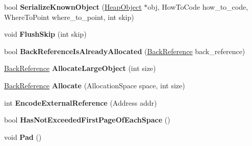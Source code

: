 \begin{DoxyCompactItemize}
\item 
bool {\bfseries Serialize\+Known\+Object} (\hyperlink{classv8_1_1internal_1_1_heap_object}{Heap\+Object} $\ast$obj, How\+To\+Code how\+\_\+to\+\_\+code, Where\+To\+Point where\+\_\+to\+\_\+point, int skip)\hypertarget{classv8_1_1internal_1_1_serializer_a27e6e9673737b561ecb102c2b6236034}{}\label{classv8_1_1internal_1_1_serializer_a27e6e9673737b561ecb102c2b6236034}

\item 
void {\bfseries Flush\+Skip} (int skip)\hypertarget{classv8_1_1internal_1_1_serializer_a7e2eb2286a158742af313150f62b1b7a}{}\label{classv8_1_1internal_1_1_serializer_a7e2eb2286a158742af313150f62b1b7a}

\item 
bool {\bfseries Back\+Reference\+Is\+Already\+Allocated} (\hyperlink{classv8_1_1internal_1_1_back_reference}{Back\+Reference} back\+\_\+reference)\hypertarget{classv8_1_1internal_1_1_serializer_a208e83e360350f15aa04edf591bcba35}{}\label{classv8_1_1internal_1_1_serializer_a208e83e360350f15aa04edf591bcba35}

\item 
\hyperlink{classv8_1_1internal_1_1_back_reference}{Back\+Reference} {\bfseries Allocate\+Large\+Object} (int size)\hypertarget{classv8_1_1internal_1_1_serializer_ac0df9e2797e2022aca9eee374cfbe23e}{}\label{classv8_1_1internal_1_1_serializer_ac0df9e2797e2022aca9eee374cfbe23e}

\item 
\hyperlink{classv8_1_1internal_1_1_back_reference}{Back\+Reference} {\bfseries Allocate} (Allocation\+Space space, int size)\hypertarget{classv8_1_1internal_1_1_serializer_a130c394bdab285e1c1f1c06ac33eee64}{}\label{classv8_1_1internal_1_1_serializer_a130c394bdab285e1c1f1c06ac33eee64}

\item 
int {\bfseries Encode\+External\+Reference} (Address addr)\hypertarget{classv8_1_1internal_1_1_serializer_ab710617f1fb4f096d8356d0ae83315c3}{}\label{classv8_1_1internal_1_1_serializer_ab710617f1fb4f096d8356d0ae83315c3}

\item 
bool {\bfseries Has\+Not\+Exceeded\+First\+Page\+Of\+Each\+Space} ()\hypertarget{classv8_1_1internal_1_1_serializer_a21a16afa98b12bfd814f05581f4a3b83}{}\label{classv8_1_1internal_1_1_serializer_a21a16afa98b12bfd814f05581f4a3b83}

\item 
void {\bfseries Pad} ()\hypertarget{classv8_1_1internal_1_1_serializer_a559527d81f46ac224fc0437456958b47}{}\label{classv8_1_1internal_1_1_serializer_a559527d81f46ac224fc0437456958b47}


\end{DoxyCompactItemize}
